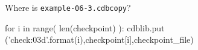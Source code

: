 \documentclass[12pt]{cdblatex}
\begin{document}
%
{}%
{Where is {\tt example-06-3.cdbcopy}?}

\clearpage


\bgroup
{}
\begin{cadabra}
   for i in range( len(checkpoint) ):
      cdblib.put ('check{:03d}'.format(i),checkpoint[i],checkpoint_file)
\end{cadabra}
\egroup
\end{document}
